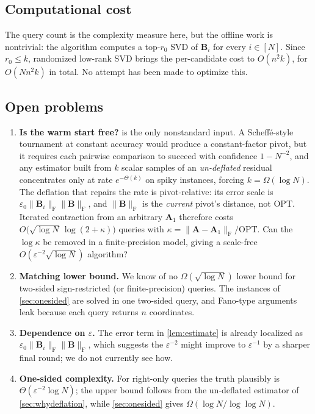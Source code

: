 \documentclass{article}
\renewcommand{\vec}[1]{\mathbf{#1}}          %
\newcommand{\F}{\mathrm{F}}                  %
\newcommand{\eps}{\varepsilon}
\newcommand{\OPT}{\mathrm{OPT}}
\theoremstyle{remark}
\begin{document}
\subsection{Computational cost}\label{sec:computation}

The query count is the complexity measure here, but the offline work is nontrivial: the algorithm computes a top-$r_0$ SVD of $\vec{B}_i$ for every $i \in [N]$.
Since $r_0 \le k$, randomized low-rank SVD brings the per-candidate cost to $O(n^2 k)$, for $O(N n^2 k)$ in total.
No attempt has been made to optimize this.

\subsection{Open problems}\label{sec:open}

\begin{enumerate}
\item \textbf{Is the warm start free?}
 is the only nonstandard input.
A Scheff\'e-style tournament at constant accuracy would produce a constant-factor pivot, but it requires each pairwise comparison to succeed with confidence $1 - N^{-2}$, and any estimator built from $k$ scalar samples of an \emph{un-deflated} residual concentrates only at rate $e^{-\Theta(k)}$ on spiky instances, forcing $k = \Omega(\log N)$.
The deflation that repairs the rate is pivot-relative: its error scale is $\eps_0\|\vec{B}_i\|_\F\|\vec{B}\|_\F$, and $\|\vec{B}\|_\F$ is the \emph{current} pivot's distance, not $\OPT$.
Iterated contraction from an arbitrary $\vec{A}_1$ therefore costs $O\bigl(\sqrt{\log N}\,\log(2+\kappa)\bigr)$ queries with $\kappa = \|\vec{A} - \vec{A}_1\|_\F/\OPT$.
Can the $\log\kappa$ be removed in a finite-precision model, giving a scale-free $O(\eps^{-2}\sqrt{\log N})$ algorithm?
\item \textbf{Matching lower bound.}
We know of no $\Omega(\sqrt{\log N})$ lower bound for two-sided sign-restricted (or finite-precision) queries.
The instances of \cref{sec:onesided} are solved in one two-sided query, and Fano-type arguments leak because each query returns $n$ coordinates.
\item \textbf{Dependence on $\eps$.}
The error term in \cref{lem:estimate} is already localized as $\eps_0\|\vec{B}_i\|_\F\|\vec{B}\|_\F$, which suggests the $\eps^{-2}$ might improve to $\eps^{-1}$ by a sharper final round; we do not currently see how.
\item \textbf{One-sided complexity.}
For right-only queries the truth plausibly is $\Theta(\eps^{-2}\log N)$; the upper bound follows from the un-deflated estimator of \cref{sec:whydeflation}, while \cref{sec:onesided} gives $\Omega(\log N/\log\log N)$.
\end{enumerate}

\printbibliography
\end{document}

